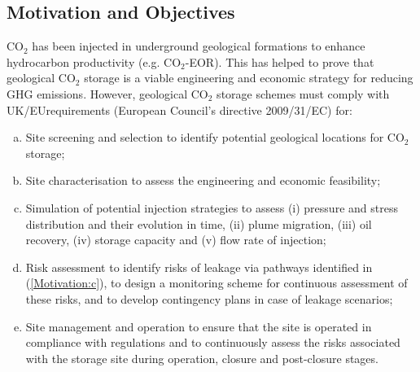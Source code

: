 \documentclass[12pts,a4paper,amsmath,amssymb,floatfix]{article}%
\newcommand{\CO}{CO\ensuremath{_{2}}}
\begin{document}

\subsection{Motivation and Objectives}
\CO\; has been injected in underground geological formations to enhance hydrocarbon productivity (e.g. \CO-EOR). %
This has helped to prove that geological \CO\; storage is a viable engineering and economic strategy for reducing GHG emissions. However, geological \CO\; storage schemes must comply with UK/EUrequirements (European Council's directive 2009/31/EC) for:
\begin{enumerate}[(a)]
%
   \item Site screening and selection to identify potential geological locations for \CO\; storage;\label{Motivation:a}
%
   \item Site characterisation to assess the engineering and economic feasibility;\label{Motivation:b}
%
   \item Simulation of potential injection strategies to assess (i) pressure and stress distribution and their evolution in time, (ii) plume migration, (iii) oil recovery, (iv) storage capacity and (v) flow rate of injection;\label{Motivation:c}
%
   \item Risk assessment to identify risks of leakage via pathways identified in (\ref{Motivation:c}), to design a monitoring scheme for continuous assessment of these risks, and to develop contingency plans in case of  leakage scenarios;\label{Motivation:d}
%
   \item Site management and operation to ensure that the site is operated in compliance with regulations and to continuously assess the risks associated with the storage site during operation, closure and post-closure stages.\label{Motivation:e} 
%
\end{enumerate}
 
\end{document}
